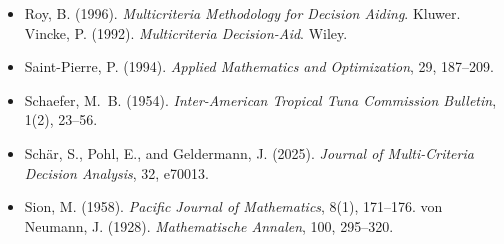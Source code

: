 \begin{itemize}[leftmargin=1.5em,itemsep=1pt]
\item Roy, B. (1996). \emph{Multicriteria Methodology for Decision Aiding}. Kluwer. Vincke, P. (1992). \emph{Multicriteria Decision-Aid}. Wiley.
\item Saint-Pierre, P. (1994). \emph{Applied Mathematics and Optimization}, 29, 187--209.
\item Schaefer, M.~B. (1954). \emph{Inter-American Tropical Tuna Commission Bulletin}, 1(2), 23--56.
\item Sch\"ar, S., Pohl, E., and Geldermann, J. (2025). \emph{Journal of Multi-Criteria Decision Analysis}, 32, e70013.
\item Sion, M. (1958). \emph{Pacific Journal of Mathematics}, 8(1), 171--176. von Neumann, J. (1928). \emph{Mathematische Annalen}, 100, 295--320.
\end{itemize}


